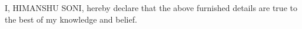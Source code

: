\begin{cventries}
  \cventry
    {}
    {}
    {}
    {}
    {I, HIMANSHU SONI, hereby declare that the above furnished details are true to the best of my knowledge and belief.}
\end{cventries}
